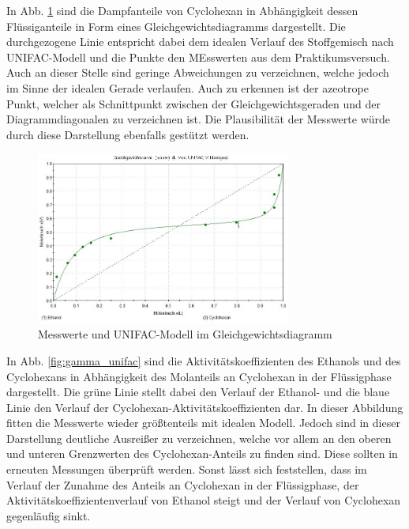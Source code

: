In Abb. \ref{fig:ggw_unifac} sind die Dampfanteile von Cyclohexan in Abhängigkeit dessen Flüssiganteile in Form eines Gleichgewichtsdiagramms dargestellt. Die durchgezogene Linie entspricht dabei dem idealen Verlauf des Stoffgemisch nach \textsc{UNIFAC}-Modell und die Punkte den MEsswerten aus dem Praktikumsversuch. Auch an dieser Stelle sind geringe Abweichungen zu verzeichnen, welche jedoch im Sinne der idealen Gerade verlaufen. Auch zu erkennen ist der azeotrope Punkt, welcher als Schnittpunkt zwischen der Gleichgewichtsgeraden und der Diagrammdiagonalen zu verzeichnen ist. Die Plausibilität der Messwerte würde durch diese Darstellung ebenfalls gestützt werden.
\begin{figure}[h!]
	\centering
	\includegraphics[width=0.75\textwidth]{img/GGW_unifac}
	\caption{Messwerte und \textsc{UNIFAC}-Modell im Gleichgewichtsdiagramm}
	\label{fig:ggw_unifac}
\end{figure}
\FloatBarrier
In Abb. \ref{fig:gamma_unifac} sind die Aktivitätskoeffizienten des Ethanols und des Cyclohexans in Abhängigkeit des Molanteils an Cyclohexan in der Flüssigphase dargestellt. Die grüne Linie stellt dabei den Verlauf der Ethanol- und die blaue Linie den Verlauf der Cyclohexan-Aktivitätskoeffizienten dar. In dieser Abbildung fitten die Messwerte wieder größtenteils mit idealen Modell. Jedoch sind in dieser Darstellung deutliche Ausreißer zu verzeichnen, welche vor allem an den oberen und unteren Grenzwerten des Cyclohexan-Anteils zu finden sind. Diese sollten in erneuten Messungen überprüft werden. Sonst lässt sich feststellen, dass im Verlauf der Zunahme des Anteils an Cyclohexan in der Flüssigphase, der Aktivitätskoeffizientenverlauf von Ethanol steigt und der Verlauf von Cyclohexan gegenläufig sinkt.
